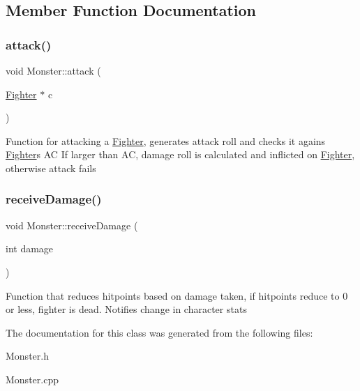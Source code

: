 \subsection{Member Function Documentation}
\hypertarget{class_monster_ad1805087dbd4472ace66a45f053aa250}{}\label{class_monster_ad1805087dbd4472ace66a45f053aa250} 
\subsubsection{\texorpdfstring{attack()}{attack()}}
{\footnotesize\ttfamily void Monster\+::attack (\begin{DoxyParamCaption}\item[{\hyperlink{class_fighter}{Fighter} $\ast$}]{c }\end{DoxyParamCaption})}

Function for attacking a \hyperlink{class_fighter}{Fighter}, generates attack roll and checks it agains \hyperlink{class_fighter}{Fighter}\textquotesingle{}s AC If larger than AC, damage roll is calculated and inflicted on \hyperlink{class_fighter}{Fighter}, otherwise attack fails \hypertarget{class_monster_a8a0aadbb74bed6181adb79b58d67d0a8}{}\label{class_monster_a8a0aadbb74bed6181adb79b58d67d0a8} 
\subsubsection{\texorpdfstring{receive\+Damage()}{receiveDamage()}}
{\footnotesize\ttfamily void Monster\+::receive\+Damage (\begin{DoxyParamCaption}\item[{int}]{damage }\end{DoxyParamCaption})}

Function that reduces hitpoints based on damage taken, if hitpoints reduce to 0 or less, fighter is dead. Notifies change in character stats 

The documentation for this class was generated from the following files\+:\begin{DoxyCompactItemize}
\item 
Monster.\+h\item 
Monster.\+cpp\end{DoxyCompactItemize}
